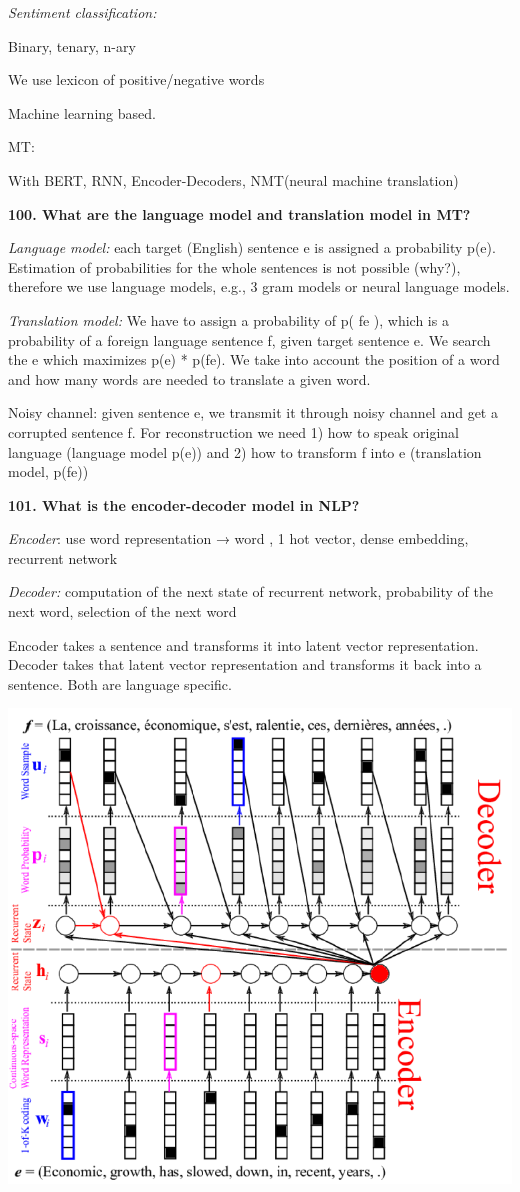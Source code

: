 \textit{Sentiment classification:}

Binary, tenary, n-ary

We use lexicon of positive/negative words

Machine learning based.

MT:

With BERT, RNN, Encoder-Decoders, NMT(neural machine translation)

\textbf{100. What are the language model and translation model in MT?}

\textit{Language model:} each target (English) sentence e is assigned
a probability p(e). Estimation of probabilities for the whole sentences
is not possible (why?), therefore we use language models, e.g., 3 gram
models or neural language models.

\textit{Translation model:} We have to assign a probability of p(
f\textbar e ), which is a probability of a foreign language sentence f,
given target sentence e. We search the e which maximizes p(e) *
p(f\textbar e). We take into account the position of a word and how many
words are needed to translate a given word.

Noisy channel: given sentence e, we transmit it through noisy channel
and get a corrupted sentence f. For reconstruction we need 1) how to
speak original language (language model p(e)) and 2) how to transform f
into e (translation model, p(f\textbar e))

\textbf{101. What is the encoder-decoder model in NLP?}

\textit{Encoder}: use word representation → word , 1 hot vector,
dense embedding, recurrent network

\textit{Decoder:} computation of the next state of recurrent network,
probability of the next word, selection of the next word

Encoder takes a sentence and transforms it into latent vector
representation. Decoder takes that latent vector representation and
transforms it back into a sentence. Both are language specific.

\includegraphics[width=\columnwidth]{media/image40.png}

